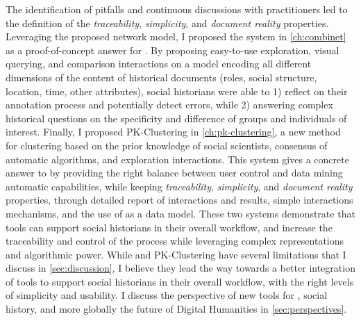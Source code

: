 The identification of pitfalls and continuous discussions with practitioners led to the definition of the \emph{traceability}, \emph{simplicity}, and \emph{document reality} properties.
Leveraging the proposed network model, I proposed the \combinet system in \autoref{ch:combinet} as a proof-of-concept answer for \qtwo.
By proposing easy-to-use exploration, visual querying, and comparison interactions on a model encoding all different dimensions of the content of historical documents (roles, social structure, location, time, other attributes), social historians were able to 1) reflect on their annotation process and potentially detect errors, while 2) answering complex historical questions on the specificity and difference of groups and individuals of interest.
Finally, I proposed PK-Clustering in \autoref{ch:pk-clustering}, a new method for clustering based on the prior knowledge of social scientists, consensus of automatic algorithms, and exploration interactions.
This system gives a concrete answer to \qthree by providing the right balance between user control and data mining automatic capabilities, while keeping \emph{traceability}, \emph{simplicity}, and \emph{document reality} properties, through detailed report of interactions and results, simple interactions mechanisms, and the use of \modelplural as a data model.
These two systems demonstrate that \va tools can support social historians in their overall workflow, and increase the traceability and control of the process while leveraging complex representations and algorithmic power.
While \combinet and PK-Clustering have several limitations that I discuss in \autoref{sec:discussion}, I believe they lead the way towards a better integration of \va tools to support social historians in their overall workflow, with the right levels of simplicity and usability.
I discuss the perspective of new \va tools for \hsna, social history, and more globally the future of Digital Humanities in \autoref{sec:perspectives}.









